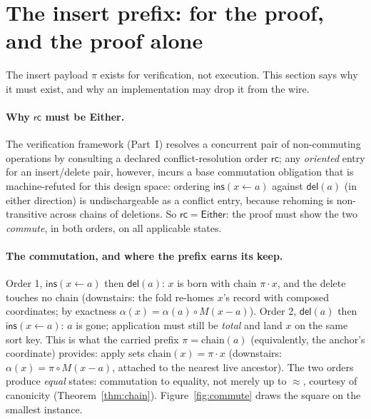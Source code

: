 \documentclass[11pt]{article}
\newcommand{\rcrel}{\mathsf{rc}}                 %
\newcommand{\del}{\mathsf{del}}
\newcommand{\ins}{\mathsf{ins}}
\newcommand{\Either}{\textsf{Either}}
\newcommand{\chain}{\mathrm{chain}}
\begin{document}
\section{The insert prefix: for the proof, and the proof alone}
\label{sec:prefix}

The insert payload $\pi$ exists for verification, not execution.
This section says why it must exist, and why an implementation may
drop it from the wire.

\paragraph{Why $\rcrel$ must be \Either.} The verification framework
(Part~I) resolves a concurrent pair of
non-commuting operations by consulting a declared
conflict-resolution order $\rcrel$; any \emph{oriented} entry for an
insert/delete pair, however, incurs a base commutation obligation
that is machine-refuted for this design space: ordering
$\ins(x \leftarrow a)$ against $\del(a)$ (in either direction) is
undischargeable as a conflict entry, because rehoming is
non-transitive across chains of deletions. So $\rcrel = \Either$: the
proof must show the two \emph{commute}, in both orders, on all
applicable states.

\paragraph{The commutation, and where the prefix earns its keep.}
Order 1, $\ins(x \leftarrow a)$ then $\del(a)$: $x$ is born with
chain $\pi \cdot x$, and the delete touches no chain (downstairs: the
fold re-homes $x$'s record with composed coordinates; by exactness
$\alpha(x) = \alpha(a) \circ M(x - a)$). Order 2, $\del(a)$ then
$\ins(x \leftarrow a)$: $a$ is gone; application must still be
\emph{total} and land $x$ on the same sort key. This is what the
carried prefix $\pi = \chain(a)$ (equivalently, the anchor's
coordinate) provides: apply sets
$\chain(x) = \pi \cdot x$ (downstairs:
$\alpha(x) = \pi \circ M(x - a)$, attached to the nearest live
ancestor). The two orders produce \emph{equal} states: commutation
to equality, not merely up to $\approx$, courtesy of canonicity
(Theorem~\ref{thm:chain}). Figure~\ref{fig:commute} draws the square
on the smallest instance.
\end{document}
